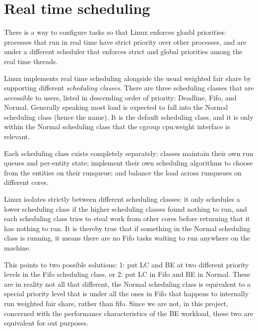 
\section{Real time scheduling}
\label{sec:sched-rt}

There is a way to configure tasks so that Linux enforces gloabl priorities:
processes that run in real time have strict priority over other processes, and
are under a different scheduler that enforces strict and global priorities among
the real time threads.

Linux implements real time scheduling alongside the usual weighted fair share by
supporting different \textit{scheduling classes}. There are three scheduling
classes that are accessible to users, listed in descending order of priority:
Deadline, Fifo, and Normal. Generally speaking most load is expected to fall
into the Normal scheduling class (hence the name). It is the default scheduling
class, and it is only within the Normal scheduling class that the cgroup
cpu.weight interface is relevant.

Each scheduling class exists completely separately: classes maintain their own
run queues and per-entity state; implement their own scheduling algorithms to
choose from the entities on their runqueue; and balance the load across
runqueues on different cores.

Linux isolates strictly between different scheduling classes: it only schedules
a lower scheduling class if the higher scheduling classes found nothing to run,
and each scheduling class tries to steal work from other cores before returning
that it has nothing to run. It is thereby true that if something in the Normal
scheduling class is running, it means there are no Fifo tasks waiting to run
anywhere on the machine.

This points to two possible solutions: 1: put LC and BE at two different priority
levels in the Fifo scheduling class, or 2: put LC in Fifo and BE in Normal. These
are in reality not all that different, the Normal scheduling class is equivalent
to a special priority level that is under all the ones in Fifo that happens to
internally run weighted fair share, rather than fifo. Since we are not, in this
project, concerned with the performance characteristics of the BE workload,
these two are equivalent for out purposes.

